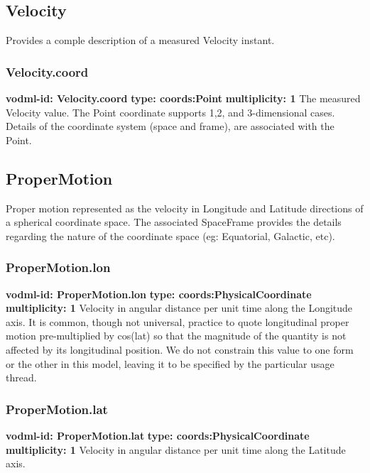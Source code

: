   \subsection{Velocity}
  \label{sect:Velocity}
    Provides a comple description of a measured Velocity instant.

    \subsubsection{Velocity.coord}
      \textbf{vodml-id: Velocity.coord} \newline
      \textbf{type: coords:Point} \newline
      \textbf{multiplicity: 1} \newline 
      The measured Velocity value. The Point coordinate supports 1,2, and 3-dimensional cases. Details of the coordinate system (space and frame), are associated with the Point.


  \subsection{ProperMotion}
  \label{sect:ProperMotion}
    Proper motion represented as the velocity in Longitude and Latitude directions of a spherical coordinate space. The associated SpaceFrame provides the details regarding the nature of the coordinate space (eg: Equatorial, Galactic, etc).

    \subsubsection{ProperMotion.lon}
      \textbf{vodml-id: ProperMotion.lon} \newline
      \textbf{type: coords:PhysicalCoordinate} \newline
      \textbf{multiplicity: 1} \newline 
      Velocity in angular distance per unit time along the Longitude axis. It is common, though not universal, practice to quote longitudinal proper motion pre-multiplied by cos(lat) so that the magnitude of the quantity is not affected by its longitudinal position. We do not constrain this value to one form or the other in this model, leaving it to be specified by the particular usage thread.

    \subsubsection{ProperMotion.lat}
      \textbf{vodml-id: ProperMotion.lat} \newline
      \textbf{type: coords:PhysicalCoordinate} \newline
      \textbf{multiplicity: 1} \newline 
      Velocity in angular distance per unit time along the Latitude axis.

